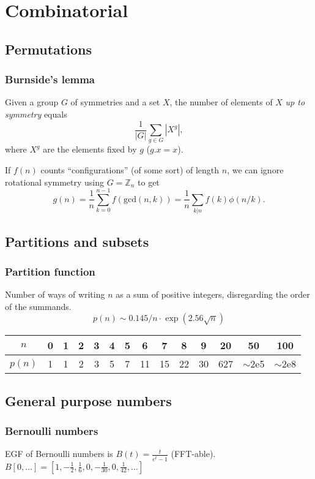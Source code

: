 \chapter{Combinatorial}

\section{Permutations}

	\subsection{Burnside's lemma}
		Given a group $G$ of symmetries and a set $X$, the number of elements of $X$ \emph{up to symmetry} equals
		 \[ {\frac {1}{|G|}}\sum _{{g\in G}}|X^{g}|, \]
		 where $X^{g}$ are the elements fixed by $g$ ($g.x = x$).

		 If $f(n)$ counts ``configurations'' (of some sort) of length $n$, we can ignore rotational symmetry using $G = \mathbb Z_n$ to get
		 \[ g(n) = \frac 1 n \sum_{k=0}^{n-1}{f(\text{gcd}(n, k))} = \frac 1 n \sum_{k|n}{f(k)\phi(n/k)}. \]

\section{Partitions and subsets}
	\subsection{Partition function}
		Number of ways of writing $n$ as a sum of positive integers, disregarding the order of the summands.
		\[ p(n) \sim 0.145 / n \cdot \exp(2.56 \sqrt{n}) \]

		\begin{center}
		\begin{tabular}{c|c@{\ }c@{\ }c@{\ }c@{\ }c@{\ }c@{\ }c@{\ }c@{\ }c@{\ }c@{\ }c@{\ }c@{\ }c}
			$n$    & 0 & 1 & 2 & 3 & 4 & 5 & 6  & 7  & 8  & 9  & 20  & 50  & 100 \\ \hline
			$p(n)$ & 1 & 1 & 2 & 3 & 5 & 7 & 11 & 15 & 22 & 30 & 627 & $\mathtt{\sim}$2e5 & $\mathtt{\sim}$2e8 \\
		\end{tabular}
		\end{center}


\section{General purpose numbers}
	\subsection{Bernoulli numbers}
		EGF of Bernoulli numbers is $B(t)=\frac{t}{e^t-1}$ (FFT-able).
		$B[0,\ldots] = [1, -\frac{1}{2}, \frac{1}{6}, 0, -\frac{1}{30}, 0, \frac{1}{42}, \ldots]$

